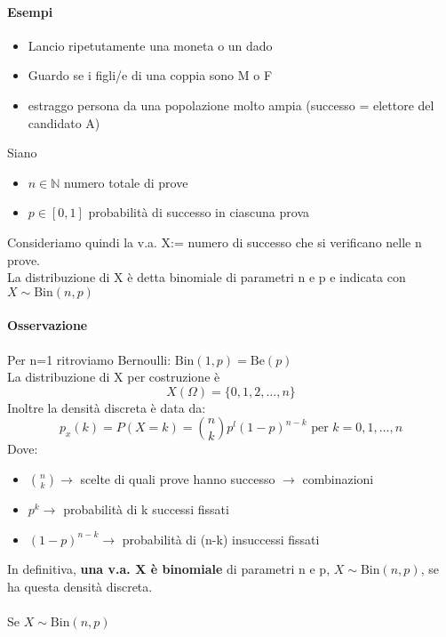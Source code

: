 \paragraph*{Esempi} \begin{itemize}
    \item Lancio ripetutamente una moneta o un dado
    \item Guardo se i figli/e di una coppia sono M o F
    \item estraggo persona da una popolazione molto ampia (successo = elettore del candidato A)
\end{itemize}
Siano \begin{itemize}
    \item $n \in \mathbb{N}$ numero totale di prove
    \item $p \in [0,1]$ probabilità di successo in ciascuna prova
\end{itemize}
Consideriamo quindi la v.a. X:= numero di successo che si verificano nelle n prove.
\\ La distribuzione di X è detta binomiale di parametri n e p e indicata con $X \sim \text{Bin}(n,p)$
\paragraph*{Osservazione} Per n=1 ritroviamo Bernoulli: $\text{Bin}(1,p) = \text{Be}(p)$
\\ La distribuzione di X per costruzione è
\begin{equation*}
    X(\Omega) = \{0,1,2,\dots,n\}
\end{equation*}
Inoltre la densità discreta è data da:
\begin{equation*}
    p_x (k) = P(X=k) = \binom{n}{k}p^l (1-p)^{n-k} \text{ per } k = 0,1,\dots, n
\end{equation*}
Dove: \begin{itemize}
    \item $\binom{n}{k} \rightarrow$ scelte di quali prove hanno successo $\rightarrow$ combinazioni
    \item $p^k \rightarrow$ probabilità di k successi fissati
    \item $(1-p)^{n-k} \rightarrow$ probabilità di (n-k) insuccessi fissati
\end{itemize}

In definitiva, \textbf{una v.a. X è binomiale} di parametri n e p, $X \sim \text{Bin}(n,p)$,
se ha questa densità discreta.
\\
\\ Se $X \sim \text{Bin}(n,p)$
